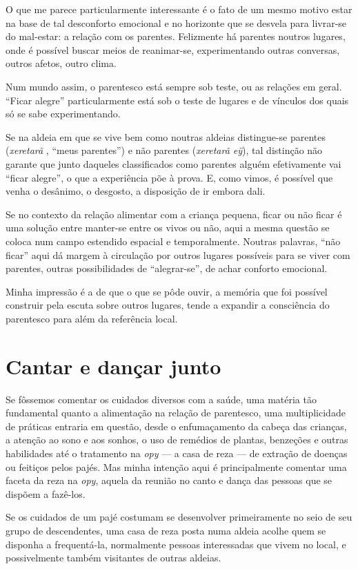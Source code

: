 O que me parece particularmente interessante é o fato de um mesmo motivo
estar na base de tal desconforto emocional e no horizonte que se
desvela para livrar-se do mal-estar: a relação com os parentes.
Felizmente há parentes noutros lugares, onde é possível buscar meios de
reanimar-se, experimentando outras conversas, outros afetos, outro
clima. 

Num mundo assim, o parentesco está sempre sob teste, ou as relações em
geral. ``Ficar alegre'' particularmente está sob o teste de lugares e de
vínculos dos quais só se sabe experimentando. 

Se na aldeia em que se vive bem como noutras aldeias distingue-se
parentes (\emph{xeretarã} , ``meus parentes'') e não parentes (\emph{xeretarã eÿ}), tal
distinção não garante que junto daqueles classificados como parentes
alguém efetivamente vai ``ficar alegre'', o que a experiência põe à
prova. E, como vimos, é possível que venha o desânimo, o desgosto, a
disposição de ir embora dali.

Se no contexto da relação alimentar com a criança pequena, ficar ou não
ficar é uma solução entre manter-se entre os vivos ou não, aqui a mesma
questão se coloca num campo estendido espacial e temporalmente. Noutras
palavras, ``não ficar'' aqui dá margem à circulação por outros lugares
possíveis para se viver com parentes, outras possibilidades de
``alegrar-se'', de achar conforto emocional. 

Minha impressão é a de que o que se pôde ouvir, a memória que foi
possível construir pela escuta sobre outros lugares, tende a expandir a
consciência do parentesco para além da referência local. 

\section{Cantar e dançar junto}

Se fôssemos comentar os cuidados diversos com a saúde, uma matéria tão
fundamental quanto a alimentação na relação de parentesco, uma
multiplicidade de práticas entraria em questão, desde o enfumaçamento
da cabeça das crianças, a atenção ao sono e aos sonhos, o uso de
remédios de plantas, benzeções e outras habilidades até o tratamento na
\emph{opy} --- a casa de reza --- de extração de doenças ou feitiços pelos pajés.
Mas minha intenção aqui é principalmente comentar uma faceta da reza na
\emph{opy}, aquela da reunião no canto e dança das pessoas que se dispõem a
fazê-los.

Se os cuidados de um pajé costumam se desenvolver primeiramente no seio
de seu grupo de descendentes, uma casa de reza posta numa aldeia acolhe
quem se disponha a frequentá-la, normalmente pessoas interessadas que
vivem no local, e possivelmente também visitantes de outras aldeias.

